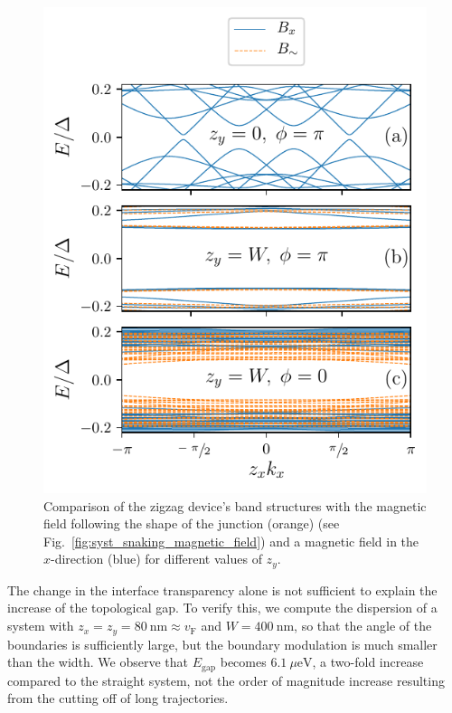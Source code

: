 \documentclass[english, twocolumn, 10pt, aps, superscriptaddress, floatfix, prb, citeautoscript]{revtex4-1}
\renewcommand{\comment}[2]{#2}
\begin{document}
\begin{figure}[!htb]
\centering
\includegraphics{figures/snaking_magnetic_field.pdf}
\caption{
Comparison of the zigzag device's band structures with the magnetic field following the shape of the junction (orange) (see Fig.~\ref{fig:syst_snaking_magnetic_field}) and a magnetic field in the $x$-direction (blue) for different values of $z_y$.
\label{fig:snaking_magnetic_field}}
\end{figure}

\comment{In a realistic device the magnetic field might not be inhomogeneous, but zigzag doesn't care.}
The change in the interface transparency alone is not sufficient to explain the increase of the topological gap.
To verify this, we compute the dispersion of a system with $z_x = z_y = \SI{80}{\nm} \approx v_\textrm{F}$ and $W=\SI{400}{\nm}$, so that the angle of the boundaries is sufficiently large, but the boundary modulation is much smaller than the width.
We observe that $E_\textrm{gap}$ becomes $\SI{6.1}{\mu \eV}$, a two-fold increase compared to the straight system, not the order of magnitude increase resulting from the cutting off of long trajectories.
\end{document}
